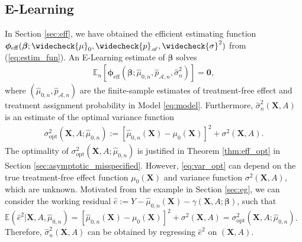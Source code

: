 \documentclass[11pt]{article}
\theoremstyle{definition}
\theoremstyle{remark}
\newcommand{\bX}{\bm{X}}
\newcommand{\bbeta}{\bm{\beta}}
\newcommand{\bphi}{\bm{\phi}}
\newcommand{\bbE}{\mathbb{E}}
\newcommand{\sA}{\mathscr{A}}
\newcommand{\bzero}{\mathbf{0}}	%
\newcommand{\eff}{\mathrm{eff}}
\newcommand{\opt}{\mathrm{opt}}
\begin{document}
\subsection{E-Learning}\label{sec:eLearn}
In Section \ref{sec:eff}, we have obtained the efficient estimating function $ \bphi_{\eff}(\bbeta;\widecheck{\mu}_{0},\widecheck{p}_{\sA},\widecheck{\sigma}^{2}) $ from (\ref{eq:estim_fun}). 
An E-Learning estimate of $ \bbeta $ solves 
\begin{align}
	\bbE_{n}[\bphi_{\eff}(\bbeta;\widehat{\mu}_{0,n},\widehat{p}_{\sA,n},\widehat{\sigma}_{n}^{2})] = \bzero,\label{eq:eLearn}
\end{align}
where $ (\widehat{\mu}_{0,n},\widehat{p}_{\sA,n}) $ are the finite-sample estimates of treatment-free effect and treatment assignment probability in Model \eqref{eq:model}. Furthermore, $ \widehat{\sigma}_{n}^{2}(\bX,A) $ is an estimate of the optimal variance function
\begin{align}
	\sigma_{\opt}^{2}(\bX,A;\widehat{\mu}_{0,n}) := [\widehat{\mu}_{0,n}(\bX) - \mu_{0}(\bX)]^{2} + \sigma^{2}(\bX,A).\label{eq:var_opt}
\end{align}
The optimality of $ \sigma_{\opt}^{2}(\bX,A;\widehat{\mu}_{0,n}) $ is justified in Theorem \ref{thm:eff_opt} in Section \ref{sec:asymptotic_misspecified}. However, \eqref{eq:var_opt} can depend on the true treatment-free effect function $ \mu_{0}(\bX) $ and variance function $ \sigma^{2}(\bX,A) $, which are unknown. Motivated from the example in Section \ref{sec:eg}, we can consider the working residual $ \widehat{e} := Y - \widehat{\mu}_{0,n}(\bX) - \gamma(\bX,A;\bbeta) $, such that $ \bbE(\widehat{e}^{2}|\bX,A,\widehat{\mu}_{0,n}) = [\widehat{\mu}_{0,n}(\bX) - \mu_{0}(\bX)]^{2} + \sigma^{2}(\bX,A) = \sigma_{\opt}^{2}(\bX,A;\widehat{\mu}_{0,n}) $. Therefore, $ \widehat{\sigma}_{n}^{2}(\bX,A) $ can be obtained by regressing $ \widehat{e}^{2} $ on $ (\bX,A) $.
\end{document}
